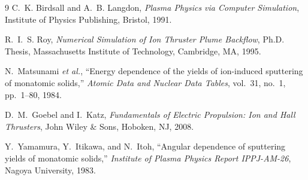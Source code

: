 \documentclass[11pt,a4paper]{article}
\begin{document}
\begin{thebibliography}{9}
C.~K. Birdsall and A.~B. Langdon,
\textit{Plasma Physics via Computer Simulation},
Institute of Physics Publishing, Bristol, 1991.

R.~I.~S. Roy, \textit{Numerical Simulation of Ion Thruster Plume Backflow}, Ph.D. Thesis, Massachusetts Institute of Technology, Cambridge, MA, 1995.

N.~Matsunami \textit{et al.},
``Energy dependence of the yields of ion-induced sputtering of monatomic solids,'' \textit{Atomic Data and Nuclear Data Tables}, vol.~31, no.~1, pp.~1--80, 1984.

D.~M.~Goebel and I.~Katz,
\textit{Fundamentals of Electric Propulsion: Ion and Hall Thrusters},
John Wiley \& Sons, Hoboken, NJ, 2008.

Y.~Yamamura, Y.~Itikawa, and N.~Itoh,
``Angular dependence of sputtering yields of monatomic solids,''
\textit{Institute of Plasma Physics Report IPPJ-AM-26}, Nagoya University, 1983.
\end{thebibliography}
\end{document}
